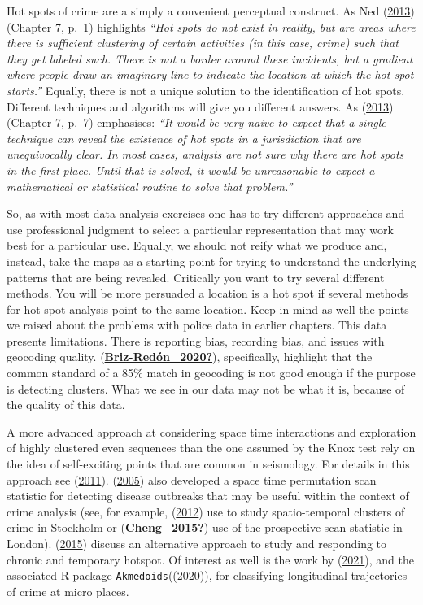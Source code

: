 \documentclass[
  krantz2]{krantz}
\begin{document}
Hot spots of crime are a simply a convenient perceptual construct. As Ned (\protect\hyperlink{ref-Levine_2013}{2013}) (Chapter 7, p.~1) highlights \emph{``Hot spots do not exist in reality, but are areas where there is sufficient clustering of certain activities (in this case, crime) such that they get labeled such. There is not a border around these incidents, but a gradient where people draw an imaginary line to indicate the location at which the hot spot starts.''} Equally, there is not a unique solution to the identification of hot spots. Different techniques and algorithms will give you different answers. As (\protect\hyperlink{ref-Levine_2013}{2013}) (Chapter 7, p.~7) emphasises: \emph{``It would be very naive to expect that a single technique can reveal the existence of hot spots in a jurisdiction that are unequivocally clear. In most cases, analysts are not sure why there are hot spots in the first place. Until that is solved, it would be unreasonable to expect a mathematical or statistical routine to solve that problem.''}

So, as with most data analysis exercises one has to try different approaches and use professional judgment to select a particular representation that may work best for a particular use. Equally, we should not reify what we produce and, instead, take the maps as a starting point for trying to understand the underlying patterns that are being revealed. Critically you want to try several different methods. You will be more persuaded a location is a hot spot if several methods for hot spot analysis point to the same location. Keep in mind as well the points we raised about the problems with police data in earlier chapters. This data presents limitations. There is reporting bias, recording bias, and issues with geocoding quality. (\protect\hyperlink{ref-Briz-Reduxf3n_2020}{\textbf{Briz-Redón\_2020?}}), specifically, highlight that the common standard of a 85\% match in geocoding is not good enough if the purpose is detecting clusters. What we see in our data may not be what it is, because of the quality of this data.

A more advanced approach at considering space time interactions and exploration of highly clustered even sequences than the one assumed by the Knox test rely on the idea of self-exciting points that are common in seismology. For details in this approach see (\protect\hyperlink{ref-Mohler_2011}{2011}). (\protect\hyperlink{ref-Kulldorff_2005}{2005}) also developed a space time permutation scan statistic for detecting disease outbreaks that may be useful within the context of crime analysis (see, for example, (\protect\hyperlink{ref-Uittenbogaard_2012}{2012}) use to study spatio-temporal clusters of crime in Stockholm or (\protect\hyperlink{ref-Cheng_2015}{\textbf{Cheng\_2015?}}) use of the prospective scan statistic in London). (\protect\hyperlink{ref-Gorr_2015}{2015}) discuss an alternative approach to study and responding to chronic and temporary hotspot. Of interest as well is the work by (\protect\hyperlink{ref-Adepeju_2021}{2021}), and the associated R package \texttt{Akmedoids}((\protect\hyperlink{ref-Adepeju_2020}{2020})), for classifying longitudinal trajectories of crime at micro places.
\end{document}
